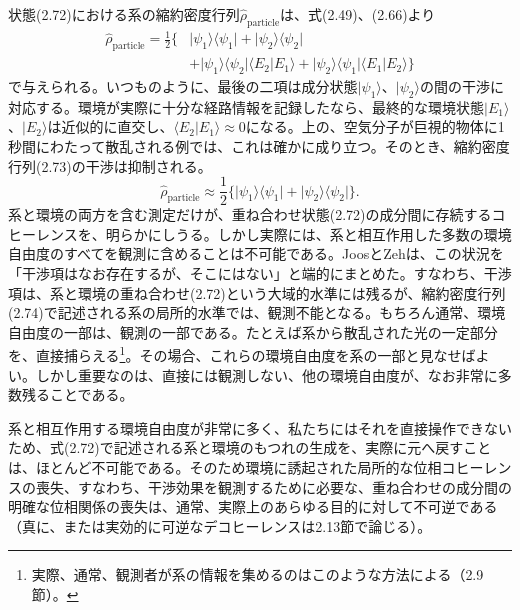 \hypertarget{srcpage:68}{}\label{srcpage:68}
状態(2.72)における系の縮約密度行列$\hat\rho_{\mathrm{particle}}$は、式(2.49)、(2.66)より
\begin{equation}\begin{split}\hat\rho_{\mathrm{particle}}=\frac12\{&\lvert\psi_1\rangle\langle\psi_1\rvert+\lvert\psi_2\rangle\langle\psi_2\rvert\\&+\lvert\psi_1\rangle\langle\psi_2\rvert\langle E_2\vert E_1\rangle+\lvert\psi_2\rangle\langle\psi_1\rvert\langle E_1\vert E_2\rangle\}\end{split}\tag{2.73}\end{equation}
で与えられる。いつものように、最後の二項は成分状態$\lvert\psi_1\rangle$、$\lvert\psi_2\rangle$の間の干渉に対応する。環境が実際に十分な経路情報を記録したなら、最終的な環境状態$\lvert E_1\rangle$、$\lvert E_2\rangle$は近似的に直交し、$\langle E_2\vert E_1\rangle\approx0$になる。上の、空気分子が巨視的物体に1秒間にわたって散乱される例では、これは確かに成り立つ。そのとき、縮約密度行列(2.73)の干渉は抑制される。
\begin{equation}\hat\rho_{\mathrm{particle}}\approx\frac12\{\lvert\psi_1\rangle\langle\psi_1\rvert+\lvert\psi_2\rangle\langle\psi_2\rvert\}.\tag{2.74}\end{equation}
系と環境の両方を含む測定だけが、重ね合わせ状態(2.72)の成分間に存続するコヒーレンスを、明らかにしうる。しかし実際には、系と相互作用した多数の環境自由度のすべてを観測に含めることは不可能である。JoosとZeh\cite[p.~224]{ref007}は、この状況を「干渉項はなお存在するが、そこにはない」と端的にまとめた。すなわち、干渉項は、系と環境の重ね合わせ(2.72)という大域的水準には残るが、縮約密度行列(2.74)で記述される系の局所的水準では、観測不能となる。もちろん通常、環境自由度の一部は、観測の一部である。たとえば系から散乱された光の一定部分を、直接捕らえる\footnote{実際、通常、観測者が系の情報を集めるのはこのような方法による（2.9節）。}。その場合、これらの環境自由度を系の一部と見なせばよい。しかし重要なのは、直接には観測しない、他の環境自由度が、なお非常に多数残ることである。

系と相互作用する環境自由度が非常に多く、私たちにはそれを直接操作できないため、式(2.72)で記述される系と環境のもつれの生成を、実際に元へ戻すことは、ほとんど不可能である。そのため環境に誘起された局所的な位相コヒーレンスの喪失、すなわち、干渉効果を観測するために必要な、重ね合わせの成分間の明確な位相関係の喪失は、通常、実際上のあらゆる目的に対して不可逆である（真に、または実効的に可逆なデコヒーレンスは2.13節で論じる）。

